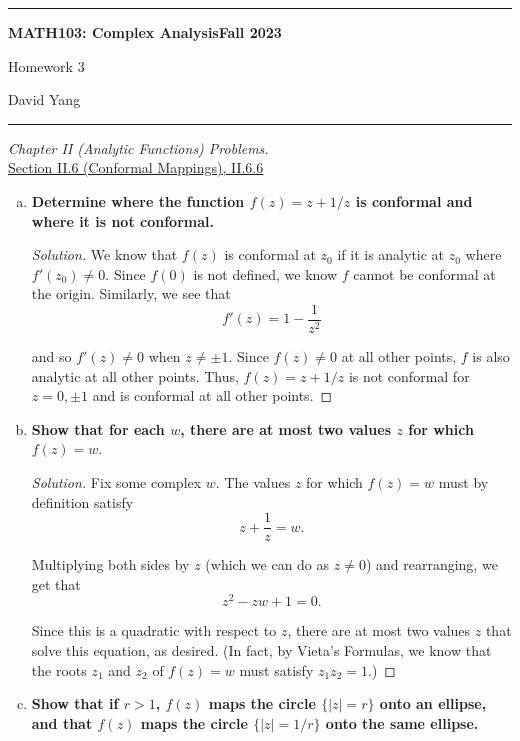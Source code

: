 \documentclass[11pt]{article}
\newenvironment{solution}
  {\renewcommand\qedsymbol{$\blacksquare$}\begin{proof}[Solution]}
  {\end{proof}}
\theoremstyle{definition}
\begin{document}
	\hrule
	\begin{center}
        \textbf{MATH103: Complex Analysis}\hfill \textbf{Fall 2023}\newline

		{\Large Homework 3}

		David Yang
	\end{center}

\hrule

\vspace{1em}


\textit{Chapter II (Analytic Functions) Problems.} \\

\underline{Section II.6 (Conformal Mappings), II.6.6}

\begin{enumerate}[a)]
    \item \textbf{Determine where the function $f(z) = z + 1/z$ is conformal and where it is not conformal.}
    \begin{solution} We know that $f(z)$ is conformal at $z_0$ if it is analytic at $z_0$ where $f'(z_0) \neq 0.$ Since $f(0)$ is not defined, we know $f$ cannot be conformal at the origin. Similarly, we see that
    \[ f'(z) = 1 - \frac{1}{z^2} \]

    and so $f'(z) \neq 0$ when $z \neq \pm 1.$ Since $f(z) \neq 0$ at all other points, $f$ is also analytic at all other points. Thus, $f(z) = z + 1/z$ is not conformal for $z = 0, \pm 1$ and is conformal at all other points. \end{solution}

    \item \textbf{Show that for each $w$, there are at most two values $z$ for which $f(z) = w.$} 
    \begin{solution} Fix some complex $w$. The values $z$ for which $f(z) = w$ must by definition satisfy
    \[ z + \frac{1}{z} = w.\]

    Multiplying both sides by $z$ (which we can do as $z \neq 0$) and rearranging, we get that
    \[ z^2 - zw + 1 = 0. \]

    Since this is a quadratic with respect to $z$, there are at most two values $z$ that solve this equation, as desired. (In fact, by Vieta's Formulas, we know that the roots $z_1$ and $z_2$ of $f(z) = w$ must satisfy $z_1z_2 = 1$.) \end{solution}

    \item \textbf{Show that if $r > 1$, $f(z)$ maps the circle $\{|z| = r\}$ onto an ellipse, and that $f(z)$ maps the circle $\{|z| = 1/r\}$ onto the same ellipse. }
    

\end{enumerate}
\end{document}
